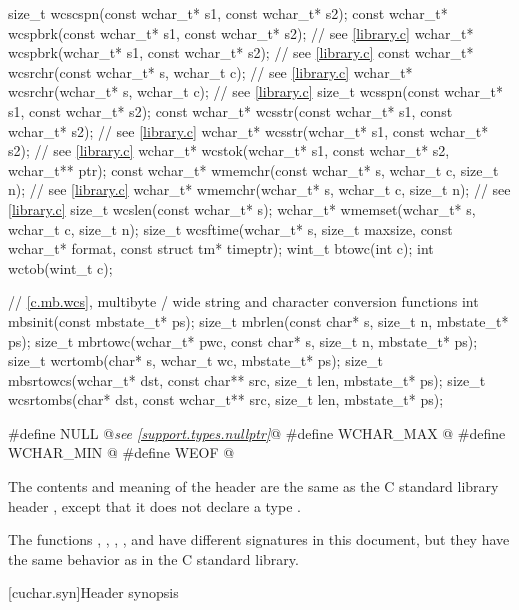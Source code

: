 \begin{codeblock}
{  size_t wcscspn(const wchar_t* s1, const wchar_t* s2);
  const wchar_t* wcspbrk(const wchar_t* s1, const wchar_t* s2); // see \ref{library.c}
  wchar_t* wcspbrk(wchar_t* s1, const wchar_t* s2);             // see \ref{library.c}
  const wchar_t* wcsrchr(const wchar_t* s, wchar_t c);          // see \ref{library.c}
  wchar_t* wcsrchr(wchar_t* s, wchar_t c);                      // see \ref{library.c}
  size_t wcsspn(const wchar_t* s1, const wchar_t* s2);
  const wchar_t* wcsstr(const wchar_t* s1, const wchar_t* s2);  // see \ref{library.c}
  wchar_t* wcsstr(wchar_t* s1, const wchar_t* s2);              // see \ref{library.c}
  wchar_t* wcstok(wchar_t* s1, const wchar_t* s2, wchar_t** ptr);
  const wchar_t* wmemchr(const wchar_t* s, wchar_t c, size_t n);    // see \ref{library.c}
  wchar_t* wmemchr(wchar_t* s, wchar_t c, size_t n);            // see \ref{library.c}
  size_t wcslen(const wchar_t* s);
  wchar_t* wmemset(wchar_t* s, wchar_t c, size_t n);
  size_t wcsftime(wchar_t* s, size_t maxsize, const wchar_t* format, const struct tm* timeptr);
  wint_t btowc(int c);
  int wctob(wint_t c);

  // \ref{c.mb.wcs}, multibyte / wide string and character conversion functions
  int mbsinit(const mbstate_t* ps);
  size_t mbrlen(const char* s, size_t n, mbstate_t* ps);
  size_t mbrtowc(wchar_t* pwc, const char* s, size_t n, mbstate_t* ps);
  size_t wcrtomb(char* s, wchar_t wc, mbstate_t* ps);
  size_t mbsrtowcs(wchar_t* dst, const char** src, size_t len, mbstate_t* ps);
  size_t wcsrtombs(char* dst, const wchar_t** src, size_t len, mbstate_t* ps);
}

#define NULL @\textit{see \ref{support.types.nullptr}}@
#define WCHAR_MAX @\seebelow@
#define WCHAR_MIN @\seebelow@
#define WEOF @\seebelow@
\end{codeblock}

\pnum
The contents and meaning of the header 
are the same as the C standard library header
, except that it does not declare a type .

\pnum
\begin{note}
The functions
, , , , and 
have different signatures in this document,
but they have the same behavior as in the C standard library.
\end{note}


[cuchar.syn]{Header  synopsis}


